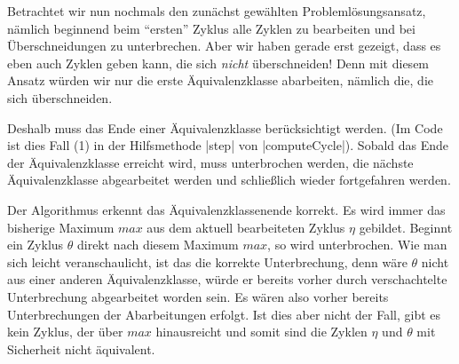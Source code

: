 Betrachtet wir nun nochmals den zunächst gewählten Problemlösungsansatz, nämlich beginnend beim ``ersten'' Zyklus alle Zyklen zu bearbeiten und bei Überschneidungen zu unterbrechen.
Aber wir haben gerade erst gezeigt, dass es eben auch Zyklen geben kann, die sich \emph{nicht} überschneiden!
Denn mit diesem Ansatz würden wir nur die erste Äquivalenzklasse abarbeiten, nämlich die, die sich überschneiden.

Deshalb muss das Ende einer Äquivalenzklasse berücksichtigt werden. (Im Code ist dies Fall (1) in der Hilfsmethode |step| von |computeCycle|).
Sobald das Ende der Äquivalenzklasse erreicht wird, muss unterbrochen werden, die nächste Äquivalenzklasse abgearbeitet werden und schließlich wieder fortgefahren werden.

Der Algorithmus erkennt das Äquivalenzklassenende korrekt. Es wird immer das bisherige Maximum $max$ aus dem aktuell bearbeiteten Zyklus $\eta$ gebildet.
Beginnt ein Zyklus $\theta$ direkt nach diesem Maximum $max$, so wird unterbrochen.
Wie man sich leicht veranschaulicht, ist das die korrekte Unterbrechung, denn wäre $\theta$ nicht aus einer anderen Äquivalenzklasse,
würde er bereits vorher durch verschachtelte Unterbrechung abgearbeitet worden sein. Es wären also vorher bereits Unterbrechungen der Abarbeitungen erfolgt.
Ist dies aber nicht der Fall, gibt es kein Zyklus, der über $max$ hinausreicht und somit sind die Zyklen $\eta$ und $\theta$ mit Sicherheit nicht äquivalent.


